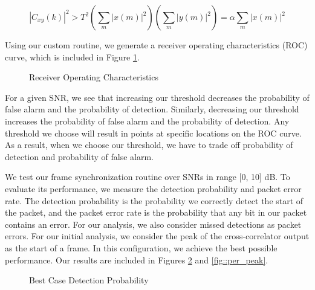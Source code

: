 \documentclass{article}
\begin{document}
\begin{equation}
	|C_{xy}(k)|^2 > T^2\left(\sum_m{|x(m)|^2}\right)\left(\sum_m{|y(m)|^2}\right) = \alpha\sum_m{|x(m)|^2}
\end{equation}

\noindent Using our custom routine, we generate a receiver operating characteristics (ROC) curve, which is included in Figure \ref{fig::roc_curve}.

\begin{figure}[H]
	\centerline{}
	\caption{Receiver Operating Characteristics}
	\label{fig::roc_curve}
\end{figure}

\noindent For a given SNR, we see that increasing our threshold decreases the probability of false alarm and the probability of detection. Similarly, decreasing our threshold increases the probability of false alarm and the probability of detection. Any threshold we choose will result in points at specific locations on the ROC curve. As a result, when we choose our threshold, we have to trade off probability of detection and probability of false alarm.

We test our frame synchronization routine over SNRs in range [0, 10] dB. To evaluate its performance, we measure the detection probability and packet error rate. The detection probability is the probability we correctly detect the start of the packet, and the packet error rate is the probability that any bit in our packet contains an error. For our analysis, we also consider missed detections as packet errors. For our initial analysis, we consider the peak of the cross-correlator output as the start of a frame. In this configuration, we achieve the best possible performance. Our results are included in Figures \ref{fig::detection_probability_peak} and \ref{fig::per_peak}.

\begin{figure}[H]
	\centerline{}
	\caption{Best Case Detection Probability}
	\label{fig::detection_probability_peak}
\end{figure}
\end{document}

